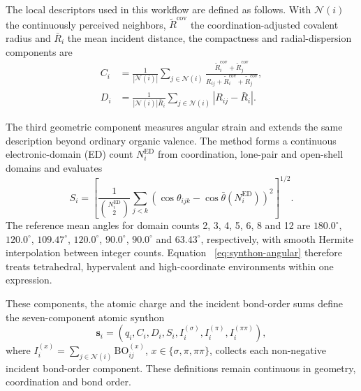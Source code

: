 \documentclass[journal=jctcce,manuscript=article]{achemso}
\begin{document}
The local descriptors used in this workflow are defined as follows.  With
$\mathcal N(i)$ the continuously perceived neighbors,
$\widetilde R^{\mathrm{cov}}$ the coordination-adjusted covalent radius and
$\bar R_i$ the mean incident distance, the compactness and radial-dispersion
components are
\begin{align}
C_i&=\frac{1}{|\mathcal N(i)|}\sum_{j\in\mathcal N(i)}
\frac{\widetilde R_i^{\mathrm{cov}}+\widetilde R_j^{\mathrm{cov}}}
{R_{ij}+\widetilde R_i^{\mathrm{cov}}+\widetilde R_j^{\mathrm{cov}}},\\
D_i&=\frac{1}{|\mathcal N(i)|\bar R_i}
\sum_{j\in\mathcal N(i)}|R_{ij}-\bar R_i|.
\end{align}

The third geometric component measures angular strain and extends the same
description beyond ordinary organic valence.  The method forms a continuous
electronic-domain (ED) count $N_i^{\mathrm{ED}}$ from coordination, lone-pair and
open-shell domains and evaluates
\begin{equation}
S_i=\left[
\frac{1}{\binom{N_i^{\mathrm{ED}}}{2}}
\sum_{j<k}\left(
\cos\theta_{ijk}-\cos\bar\theta(N_i^{\mathrm{ED}})
\right)^2
\right]^{1/2}.
\label{eq:synthon-angular}
\end{equation}
The reference mean angles for domain counts 2, 3, 4, 5, 6, 8 and 12 are
$180.0^\circ$, $120.0^\circ$, $109.47^\circ$, $120.0^\circ$,
$90.0^\circ$, $90.0^\circ$ and $63.43^\circ$, respectively, with smooth
Hermite interpolation between integer counts.  Equation~
\ref{eq:synthon-angular} therefore treats tetrahedral, hypervalent and
high-coordinate environments within one expression.

These components, the atomic charge and the incident bond-order sums define
the seven-component atomic synthon
\begin{equation}
\mathbf{s}_i=(q_i,C_i,D_i,S_i,
I_i^{(\sigma)},I_i^{(\pi)},I_i^{(\pi\pi)}),
\label{eq:synthon}
\end{equation}
where
$I_i^{(x)}=\sum_{j\in\mathcal N(i)}\mathrm{BO}_{ij}^{(x)}$,
$x\in\{\sigma,\pi,\pi\pi\}$, collects each non-negative incident bond-order
component.  These definitions remain continuous in geometry, coordination
and bond order.
\end{document}
